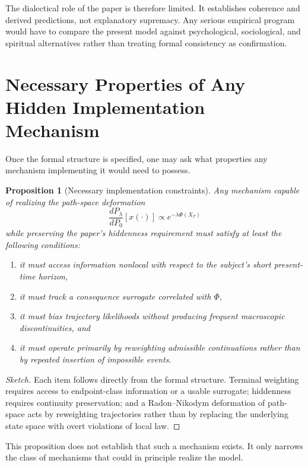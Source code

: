 \documentclass[12pt]{article}
\newtheorem{proposition}{Proposition}
\begin{document}
The dialectical role of the paper is therefore limited. It establishes coherence and derived predictions, not explanatory supremacy. Any serious empirical program would have to compare the present model against psychological, sociological, and spiritual alternatives rather than treating formal consistency as confirmation.

\section{Necessary Properties of Any Hidden Implementation Mechanism}

Once the formal structure is specified, one may ask what properties any mechanism implementing it would need to possess.

\begin{proposition}[Necessary implementation constraints]
Any mechanism capable of realizing the path-space deformation
\[
\frac{dP_\lambda}{dP_0}[x(\cdot)] \propto e^{-\lambda \Phi(X_T)}
\]
while preserving the paper's hiddenness requirement must satisfy at least the following conditions:
\begin{enumerate}[label=\arabic*.]
    \item it must access information nonlocal with respect to the subject's short present-time horizon,
    \item it must track a consequence surrogate correlated with $\Phi$,
    \item it must bias trajectory likelihoods without producing frequent macroscopic discontinuities, and
    \item it must operate primarily by reweighting admissible continuations rather than by repeated insertion of impossible events.
\end{enumerate}
\end{proposition}

\begin{proof}[Sketch]
Each item follows directly from the formal structure. Terminal weighting requires access to endpoint-class information or a usable surrogate; hiddenness requires continuity preservation; and a Radon--Nikodym deformation of path-space acts by reweighting trajectories rather than by replacing the underlying state space with overt violations of local law.
\end{proof}

This proposition does not establish that such a mechanism exists. It only narrows the class of mechanisms that could in principle realize the model.
\end{document}
